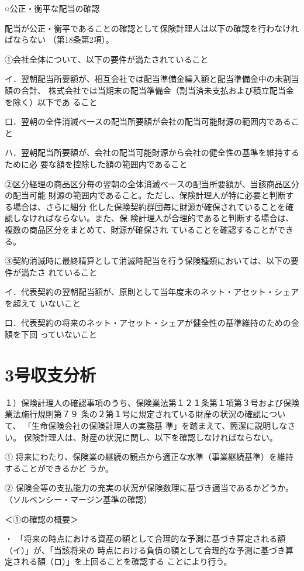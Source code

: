 \documentclass[report,gutter=10mm,fore-edge=10mm,uplatex,dvipdfmx]{jlreq}
\begin{document}
○公正・衡平な配当の確認

配当が公正・衡平であることの確認として保険計理人は以下の確認を行わなければならない
（第18条第2項）。

①会社全体について、以下の要件が満たされていること

イ．翌朝配当所要額が、相互会社では配当準備金繰入額と配当準備金中の未割当額の合計、
株式会社では当期末の配当準備金（割当済未支払および積立配当金を除く）以下であ
ること

口．翌朝の全件消滅べ一スの配当所要額が会社の配当可能財源の範囲内であること

ハ．翌朝配当所要額が、会社の配当可能財源から会社の健全性の基準を維持するために必
要な額を控除した額の範囲内であること

②区分経理の商品区分毎の翌朝の全体消滅べ一スの配当所要額が、当該商品区分の配当可能
財源の範囲内であること。ただし、保険計理人が特に必要と判断する場合は、さらに細分
化した保険契約群団毎に財源が確保されていることを確認しなければならない。また、保
険計理人が合理的であると判断する場合は、複数の商品区分をまとめて、財源が確保され
ていることを確認することができる。

③契約消滅時に最終精算として消滅時配当を行う保険種類においては、以下の要件が満たさ
れていること

イ．代表契約の翌朝配当額が、原則として当年度末のネット・アセット・シェアを超えて
いないこと

口．代表契約の将来のネット・アセット・シェアが健全性の基準維持のための金額を下回
っていないこと

\section{3号収支分析}

１）保険計理人の確認事項のうち、保険業法第１２１条第１項第３号および保険業法施行規則第７９
条の２第１号に規定されている財産の状況の確認について、
「生命保険会社の保険計理人の実務基
準」を踏まえて、簡潔に説明しなさい。
\answer{}
保険計理人は、財産の状況に関し、以下を確認しなければならない。

① 将来にわたり、保険業の継続の観点から適正な水準（事業継続基準）を維持することができるかど
うか。

② 保険金等の支払能力の充実の状況が保険数理に基づき適当であるかどうか。
（ソルベンシー・マージン基準の確認）

＜①の確認の概要＞

・ 「将来の時点における資産の額として合理的な予測に基づき算定される額（イ）」が、「当該将来の
時点における負債の額として合理的な予測に基づき算定される額（ロ）」を上回ることを確認する
ことにより行う。
\end{document}
